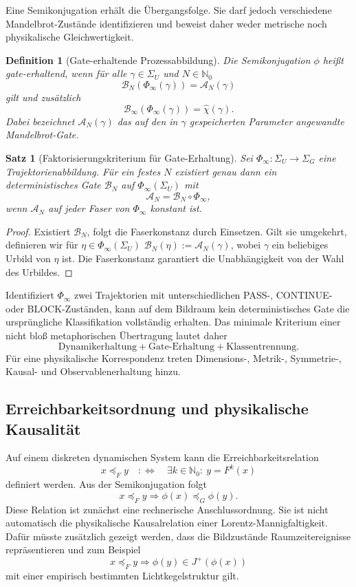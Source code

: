 \documentclass[11pt,a4paper]{article}
\newtheorem{definition}{Definition}[section]
\newtheorem{satz}{Satz}[section]
\theoremstyle{remark}
\newcommand{\N}{\mathbb{N}}
\begin{document}
Eine Semikonjugation erhält die Übergangsfolge. Sie darf jedoch verschiedene
Mandelbrot-Zustände identifizieren und beweist daher weder metrische noch
physikalische Gleichwertigkeit.

\begin{definition}[Gate-erhaltende Prozessabbildung]
Die Semikonjugation \(\phi\) heißt gate-erhaltend, wenn für alle
\(\gamma\in\Sigma_U\) und \(N\in\N_0\)
\[
  \mathcal B_N(\Phi_\infty(\gamma))=\mathcal A_N(\gamma)
\]
gilt und zusätzlich
\[
  \mathcal B_\infty(\Phi_\infty(\gamma))=\widehat\chi(\gamma).
\]
Dabei bezeichnet \(\mathcal A_N(\gamma)\) das auf den in \(\gamma\)
gespeicherten Parameter angewandte Mandelbrot-Gate.
\end{definition}

\begin{satz}[Faktorisierungskriterium für Gate-Erhaltung]
\label{satz:gate-faktorisierung}
Sei \(\Phi_\infty:\Sigma_U\to\Sigma_G\) eine Trajektorienabbildung. Für
ein festes \(N\) existiert genau dann ein deterministisches Gate
\(\mathcal B_N\) auf \(\Phi_\infty(\Sigma_U)\) mit
\[
  \mathcal A_N=\mathcal B_N\circ\Phi_\infty,
\]
wenn \(\mathcal A_N\) auf jeder Faser von \(\Phi_\infty\) konstant ist.
\end{satz}

\begin{proof}
Existiert \(\mathcal B_N\), folgt die Faserkonstanz durch Einsetzen. Gilt sie
umgekehrt, definieren wir für \(\eta\in\Phi_\infty(\Sigma_U)\)
\(\mathcal B_N(\eta):=\mathcal A_N(\gamma)\), wobei \(\gamma\) ein
beliebiges Urbild von \(\eta\) ist. Die Faserkonstanz garantiert die
Unabhängigkeit von der Wahl des Urbildes.
\end{proof}

Identifiziert \(\Phi_\infty\) zwei Trajektorien mit unterschiedlichen
PASS-, CONTINUE- oder BLOCK-Zuständen, kann auf dem Bildraum kein
deterministisches Gate die ursprüngliche Klassifikation vollständig erhalten.
Das minimale Kriterium einer nicht bloß metaphorischen Übertragung lautet
daher
\[
  \boxed{\text{Dynamikerhaltung}+\text{Gate-Erhaltung}+
  \text{Klassentrennung}.}
\]
Für eine physikalische Korrespondenz treten Dimensions-, Metrik-, Symmetrie-,
Kausal- und Observablenerhaltung hinzu.

\subsection{Erreichbarkeitsordnung und physikalische Kausalität}

Auf einem diskreten dynamischen System kann die Erreichbarkeitsrelation
\[
  x\preccurlyeq_F y
  \quad:\Longleftrightarrow\quad
  \exists k\in\N_0:\ y=F^k(x)
\]
definiert werden. Aus der Semikonjugation folgt
\[
  x\preccurlyeq_F y
  \Longrightarrow
  \phi(x)\preccurlyeq_G\phi(y).
\]
Diese Relation ist zunächst eine rechnerische Anschlussordnung. Sie ist nicht
automatisch die physikalische Kausalrelation einer Lorentz-Mannigfaltigkeit.
Dafür müsste zusätzlich gezeigt werden, dass die Bildzustände
Raumzeitereignisse repräsentieren und zum Beispiel
\[
  x\preccurlyeq_F y
  \Longrightarrow
  \phi(y)\in J^+(\phi(x))
\]
mit einer empirisch bestimmten Lichtkegelstruktur gilt.
\end{document}
